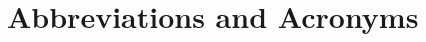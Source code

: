 \chapter*{Abbreviations and Acronyms}


\noindent
\begin{longtable}{@{}p{}p{}@{}}


\end{longtable}
